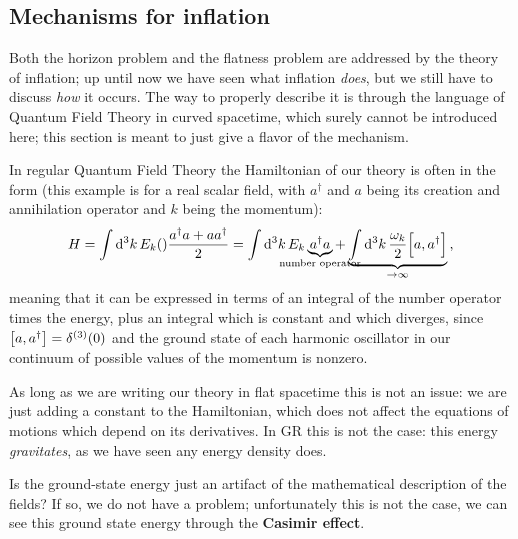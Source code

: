 \documentclass[main.tex]{subfiles}
\begin{document}
\subsection{Mechanisms for inflation}

Both the horizon problem and the flatness problem are addressed by the theory of inflation; up until now we have seen what inflation \emph{does}, but we still have to discuss \emph{how} it occurs. 
The way to properly describe it is through the language of Quantum Field Theory in curved spacetime, which surely cannot be introduced here; this section is meant to just give a flavor of the mechanism.


In regular Quantum Field Theory the Hamiltonian of our theory is often in the form (this example is for a real scalar field, with \(a ^\dag\) and \(a\) being its creation and annihilation operator and \(k\) being the momentum):
%
\begin{align}
H = \int \dd[3]{k} E_k \qty\frac{a ^\dag a + a a ^\dag}{2} = 
\int \dd[3]{k} E_k \underbrace{a ^\dag a }_{\mathclap{\text{number operator}}} + \underbrace{\int \dd[3]{k} \frac{\omega_k}{2} \qty[a, a ^\dag]}_{ \to \infty }
\,,
\end{align}
%
meaning that it can be expressed in terms of an integral of the number operator times the energy, plus an integral which is constant and which diverges, since \(\qty[a, a ^\dag] = \delta^{(3)} (0)\) and the ground state of each harmonic oscillator in our continuum of possible values of the momentum is nonzero. 

As long as we are writing our theory in flat spacetime this is not an issue: we are just adding a constant to the Hamiltonian, which does not affect the equations of motions which depend on its derivatives.  
In GR this is not the case: this energy \emph{gravitates}, as we have seen any energy density does. 

Is the ground-state energy just an artifact of the mathematical description of the fields? If so, we do not have a problem; unfortunately this is not the case, we can see this ground state energy through the \textbf{Casimir effect}.
\end{document}
